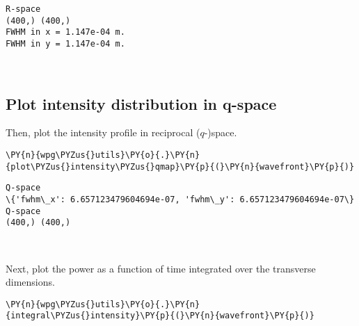     \begin{Verbatim}[commandchars=\\\{\}]
R-space
(400,) (400,)
FWHM in x = 1.147e-04 m.
FWHM in y = 1.147e-04 m.
    \end{Verbatim}

    \begin{center}
    \end{center}
    { \hspace*{\fill} \\}
    
    \hypertarget{plot-intensity-distribution-in-q-space}{%
\subsection{Plot intensity distribution in
q-space}\label{plot-intensity-distribution-in-q-space}}

Then, plot the intensity profile in reciprocal (\(q\)-)space.

    \begin{tcolorbox}[breakable, size=fbox, boxrule=1pt, pad at break*=1mm,colback=cellbackground, colframe=cellborder]
\begin{Verbatim}[commandchars=\\\{\}]
\PY{n}{wpg\PYZus{}utils}\PY{o}{.}\PY{n}{plot\PYZus{}intensity\PYZus{}qmap}\PY{p}{(}\PY{n}{wavefront}\PY{p}{)}
\end{Verbatim}
\end{tcolorbox}

    \begin{Verbatim}[commandchars=\\\{\}]
Q-space
\{'fwhm\_x': 6.657123479604694e-07, 'fwhm\_y': 6.657123479604694e-07\}
Q-space
(400,) (400,)
    \end{Verbatim}

    \begin{center}
    \end{center}
    { \hspace*{\fill} \\}
    
    Next, plot the power as a function of time integrated over the
transverse dimensions.

    \begin{tcolorbox}[breakable, size=fbox, boxrule=1pt, pad at break*=1mm,colback=cellbackground, colframe=cellborder]
\begin{Verbatim}[commandchars=\\\{\}]
\PY{n}{wpg\PYZus{}utils}\PY{o}{.}\PY{n}{integral\PYZus{}intensity}\PY{p}{(}\PY{n}{wavefront}\PY{p}{)}
\end{Verbatim}
\end{tcolorbox}


